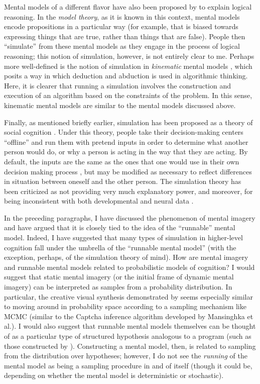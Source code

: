 \documentclass[12pt]{article}
\begin{document}
Mental models of a different flavor have also been proposed by \cite{Johnson-Laird2012} to explain logical reasoning. In the \textit{model theory}, as it is known in this context, mental models encode propositions in a particular way (for example, that is biased towards expressing things that are true, rather than things that are false). People then ``simulate'' from these mental models as they engage in the process of logical reasoning; this notion of simulation, however, is not entirely clear to me. Perhaps more well-defined is the notion of simulation in \textit{kinematic} mental models \citep{Khemlani2013}, which posits a way in which deduction and abduction is used in algorithmic thinking. Here, it is clearer that running a simulation involves the construction and execution of an algorithm based on the constraints of the problem. In this sense, kinematic mental models are similar to the mental models discussed above.

Finally, as mentioned briefly earlier, simulation has been proposed as a theory of social cognition \citep{Gordon1992,Goldman1992}. Under this theory, people take their decision-making centers ``offline'' and run them with pretend inputs in order to determine what another person would do, or why a person is acting in the way that they are acting. By default, the inputs are the same as the ones that one would use in their own decision making process \citep{Gordon1992}, but may be modified as necessary to reflect differences in situation between oneself and the other person. The simulation theory has been criticized as not providing very much explanatory power, and moreover, for being inconsistent with both developmental and neural data \citep{Stich1992,Gopnik1992,Saxe2005}.

In the preceding paragraphs, I have discussed the phenomenon of mental imagery and have argued that it is closely tied to the idea of the ``runnable'' mental model. Indeed, I have suggested that many types of simulation in higher-level cognition fall under the umbrella of the ``runnable mental model'' (with the exception, perhaps, of the simulation theory of mind). How are mental imagery and runnable mental models related to probabilistic models of cognition? I would suggest that static mental imagery (or the initial frame of dynamic mental imagery) can be interpreted as samples from a probability distribution. In particular, the creative visual synthesis demonstrated by \cite{Finke1988} seems especially similar to moving around in probability space according to a sampling mechanism like MCMC (similar to the Captcha inference algorithm developed by Mansinghka et al.). I would also suggest that runnable mental models themselves can be thought of as a particular type of structured hypothesis analogous to a program (such as those constructed by \cite{Khemlani2013}). Constructing a mental model, then, is related to sampling from the distribution over hypotheses; however, I do not see the \textit{running} of the mental model as being a sampling procedure in and of itself (though it could be, depending on whether the mental model is deterministic or stochastic).
\end{document}
